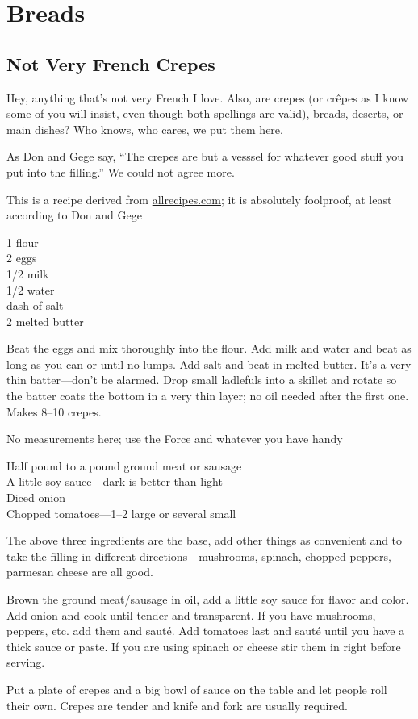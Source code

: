 \chapter{Breads}

\section{Not Very French Crepes}

\begin{open}
    Hey, anything that's not very French I love.  Also, are crepes (or
    cr\^{e}pes as I know some of you will insist, even though both spellings are
    valid), breads, deserts, or main dishes?  Who knows, who cares, we put them
    here.

    As Don and Gege say, ``The crepes are but a vesssel for whatever good stuff
    you put into the filling.''  We could not agree more.

    This is a recipe derived from \url{allrecipes.com}; it is absolutely
    foolproof, at least according to Don and Gege
\end{open}
\begin{ingredients}
    \SI{1}{\cup} flour\\
    2 eggs\\
    \SI{1/2}{\cup} milk\\
    \SI{1/2}{\cup} water\\
    dash of salt\\
    \SI{2}{\tblspoon} melted butter
\end{ingredients}
Beat the eggs and mix thoroughly into the flour. Add milk and water and beat as
long as you can or until no lumps. Add salt and beat in melted butter. It's a
very thin batter---don't be alarmed. Drop small ladlefuls into a skillet and
rotate so the batter coats the bottom in a very thin layer; no oil needed after
the first one. Makes \numrange{8}{10} crepes.


\noindent No measurements here; use the Force and whatever you have handy
\begin{ingredients}
    Half pound to a pound ground meat or sausage\\
    A little soy sauce---dark is better than light\\
    Diced onion\\
    Chopped tomatoes---\numrange{1}{2} large or several small
\end{ingredients}
The above three ingredients are the base, add other things as convenient and to take the filling in different directions---mushrooms, spinach, chopped peppers, parmesan cheese are all good.

Brown the ground meat/sausage in oil, add a little soy sauce for flavor and
color. Add onion and cook until tender and transparent. If you have mushrooms,
peppers, etc. add them and saut\'{e}. Add tomatoes last and saut\'{e} until you
have a thick sauce or paste. If you are using spinach or cheese stir them in
right before serving.

Put a plate of crepes and a big bowl of sauce on the table and let people roll
their own. Crepes are tender and knife and fork are usually required.
